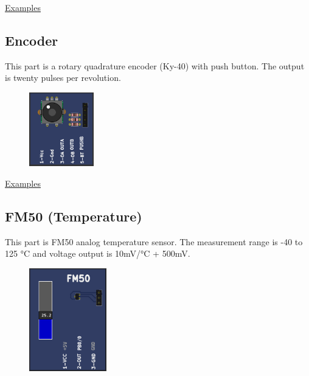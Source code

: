 \href{https://lcgamboa.github.io/picsimlab_examples/parts_DS18B20_(Temperature).html}{Examples}
  
\vspace{0.5cm}
  
\subsection{Encoder}

This part is a rotary quadrature encoder (Ky-40) with push button. The output is twenty pulses per revolution.

\begin{figure}[H]
\center
\includegraphics[width=0.25\textwidth]{img/part_encoder.png} 
\end{figure} 

\href{https://lcgamboa.github.io/picsimlab_examples/parts_Encoder.html}{Examples}

\vspace{0.5cm}
 
\subsection{FM50 (Temperature)}

This part is FM50 analog temperature sensor. The measurement range is -40 to 125 °C  and 
voltage output is 10mV/°C + 500mV.

\begin{figure}[H]
\center
\includegraphics[width=0.3\textwidth]{img/part_fm50.png} 
\end{figure} 


